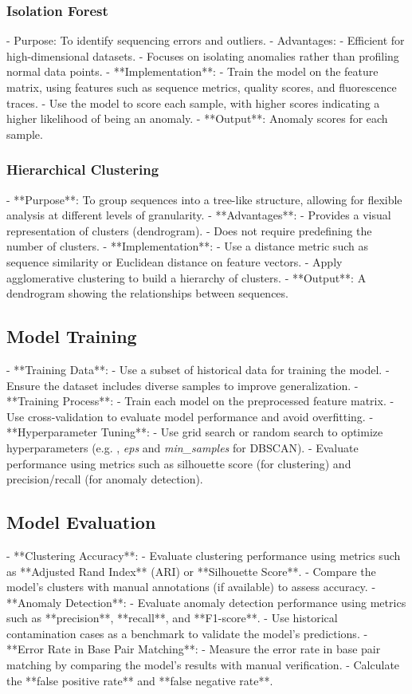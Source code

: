 \subsubsection{Isolation Forest}
- Purpose: To identify sequencing errors and outliers.
- Advantages:
  - Efficient for high-dimensional datasets.
  - Focuses on isolating anomalies rather than profiling normal data points.
- **Implementation**:
  - Train the model on the feature matrix, using features such as sequence metrics, quality scores, and fluorescence traces.
  - Use the model to score each sample, with higher scores indicating a higher likelihood of being an anomaly.
- **Output**: Anomaly scores for each sample.

\subsubsection{Hierarchical Clustering}
- **Purpose**: To group sequences into a tree-like structure, allowing for flexible analysis at different levels of granularity.
- **Advantages**:
  - Provides a visual representation of clusters (dendrogram).
  - Does not require predefining the number of clusters.
- **Implementation**:
  - Use a distance metric such as sequence similarity or Euclidean distance on feature vectors.
  - Apply agglomerative clustering to build a hierarchy of clusters.
- **Output**: A dendrogram showing the relationships between sequences.

\subsection{Model Training}
- **Training Data**:
  - Use a subset of historical data for training the model.
  - Ensure the dataset includes diverse samples to improve generalization.
- **Training Process**:
  - Train each model on the preprocessed feature matrix.
  - Use cross-validation to evaluate model performance and avoid overfitting.
- **Hyperparameter Tuning**:
  - Use grid search or random search to optimize hyperparameters (e.g. , \textit{eps} and \textit{min\_samples} for DBSCAN).
  - Evaluate performance using metrics such as silhouette score (for clustering) and precision/recall (for anomaly detection).

\subsection{Model Evaluation}
- **Clustering Accuracy**:
  - Evaluate clustering performance using metrics such as **Adjusted Rand Index** (ARI) or **Silhouette Score**.
  - Compare the model's clusters with manual annotations (if available) to assess accuracy.
- **Anomaly Detection**:
  - Evaluate anomaly detection performance using metrics such as **precision**, **recall**, and **F1-score**.
  - Use historical contamination cases as a benchmark to validate the model's predictions.
- **Error Rate in Base Pair Matching**:
  - Measure the error rate in base pair matching by comparing the model's results with manual verification.
  - Calculate the **false positive rate** and **false negative rate**.

